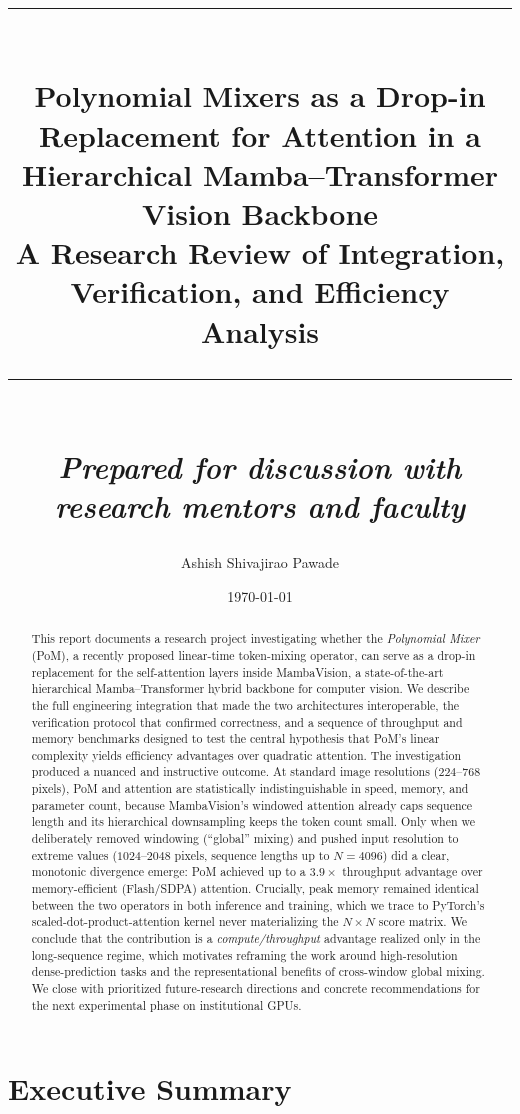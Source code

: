 \documentclass[11pt,a4paper]{article}
\title{
    \vspace{-1.5cm}
    \rule{\textwidth}{1pt}\\[0.4cm]
    {\Huge \bfseries Polynomial Mixers as a Drop-in Replacement for Attention in a Hierarchical Mamba--Transformer Vision Backbone}\\[0.3cm]
    {\Large A Research Review of Integration, Verification, and Efficiency Analysis}\\[0.3cm]
    \rule{\textwidth}{1pt}\\[0.3cm]
    {\large \textit{Prepared for discussion with research mentors and faculty}}
}
\author{Ashish Shivajirao Pawade}
\date{\today}
\begin{document}
\maketitle
\thispagestyle{empty}

\begin{abstract}
\noindent
This report documents a research project investigating whether the \emph{Polynomial Mixer} (PoM), a recently proposed linear-time token-mixing operator, can serve as a drop-in replacement for the self-attention layers inside MambaVision, a state-of-the-art hierarchical Mamba--Transformer hybrid backbone for computer vision. We describe the full engineering integration that made the two architectures interoperable, the verification protocol that confirmed correctness, and a sequence of throughput and memory benchmarks designed to test the central hypothesis that PoM's linear complexity yields efficiency advantages over quadratic attention. The investigation produced a nuanced and instructive outcome. At standard image resolutions ($224$--$768$ pixels), PoM and attention are statistically indistinguishable in speed, memory, and parameter count, because MambaVision's windowed attention already caps sequence length and its hierarchical downsampling keeps the token count small. Only when we deliberately removed windowing (``global'' mixing) and pushed input resolution to extreme values ($1024$--$2048$ pixels, sequence lengths up to $N=4096$) did a clear, monotonic divergence emerge: PoM achieved up to a $3.9\times$ throughput advantage over memory-efficient (Flash/SDPA) attention. Crucially, peak memory remained identical between the two operators in both inference and training, which we trace to PyTorch's scaled-dot-product-attention kernel never materializing the $N\times N$ score matrix. We conclude that the contribution is a \emph{compute/throughput} advantage realized only in the long-sequence regime, which motivates reframing the work around high-resolution dense-prediction tasks and the representational benefits of cross-window global mixing. We close with prioritized future-research directions and concrete recommendations for the next experimental phase on institutional GPUs.
\end{abstract}

\tableofcontents
\newpage

\section{Executive Summary}
\end{document}
